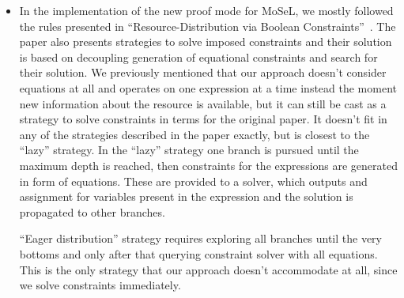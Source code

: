 \begin{itemize}
\item In the implementation of the new proof mode for MoSeL, we mostly followed the rules presented in ``Resource-Distribution via Boolean Constraints''~\cite{harlandResourceDistributionBooleanConstraints2003}.
  The paper also presents strategies to solve imposed constraints and their solution is based on decoupling generation of equational constraints and search for their solution.
  We previously mentioned that our approach doesn't consider equations at all and operates on one expression at a time instead the moment new information about the resource is available, but it can still be cast as a strategy to solve constraints in terms for the original paper.
   It doesn't fit in any of the strategies described in the paper exactly, but is closest to the ``lazy'' strategy.
  In the ``lazy'' strategy one branch is pursued until the maximum depth is reached, then constraints for the expressions are generated in form of equations.
These are provided to a solver, which outputs and assignment for variables present in the expression and the solution is propagated to other branches.

  ``Eager distribution'' strategy requires exploring all branches until the very bottoms and only after that querying constraint solver with all equations.
  This is the only strategy that our approach doesn't accommodate at all, since we solve constraints immediately.


\end{itemize}
